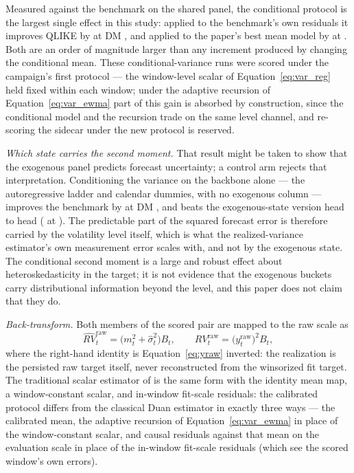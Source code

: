 Measured against the benchmark on the shared panel, the conditional
protocol is the largest single effect in this study: applied to the
benchmark's own residuals it improves QLIKE by
\unifIncrCondVarBenchDQ{} at DM \unifIncrCondVarBenchDM{}, and applied
to the paper's best mean model by \unifIncrCondVarChampDQ{} at
\unifIncrCondVarChampDM{}. Both are an order of magnitude larger than
any increment produced by changing the conditional mean. These
conditional-variance runs were scored under the campaign's first protocol --- the window-level scalar of Equation~\eqref{eq:var_reg}
held fixed within each window; under the adaptive recursion of
Equation~\eqref{eq:var_ewma} part of this gain is absorbed by
construction, since the conditional model and the recursion trade on
the same level channel, and re-scoring the sidecar under the new
protocol is reserved.

\emph{Which state carries the second moment.} That result might be taken to
show that the exogenous panel predicts forecast uncertainty; a
control arm rejects that interpretation. Conditioning the variance on the backbone alone
--- the autoregressive ladder and calendar dummies, with no exogenous
column --- improves the benchmark by \unifIncrCondVarBenchLevelDQ{} at
DM \unifIncrCondVarBenchLevelDM{}, and beats the exogenous-state
version head to head
(\unifIncrCondVarBenchLevelVsCondVarBenchDQ{} at
\unifIncrCondVarBenchLevelVsCondVarBenchDM{}). The predictable part of
the squared forecast error is therefore carried by the volatility level
itself, which is what the realized-variance estimator's own measurement
error scales with, and not by the exogenous state. The conditional
second moment is a large and robust effect about heteroskedasticity in
the target; it is not evidence that the exogenous buckets carry
distributional information beyond the level, and this paper does not
claim that they do.

\emph{Back-transform.} Both members of the scored pair are mapped to the
raw scale as
\begin{equation}
    \widehat{RV}_t^{\mathrm{raw}}
    = \bigl(m_t^2 + \hat{\sigma}^2_t\bigr) B_t,
    \qquad
    RV_t^{\mathrm{raw}} = \bigl(y^{\mathrm{raw}}_t\bigr)^2 B_t,
    \label{eq:smear_map}
\end{equation}
where the right-hand identity is Equation~\eqref{eq:yraw} inverted: the
realization is the persisted raw target itself, never reconstructed from
the winsorized fit target. The traditional scalar estimator of
\citet{Duan1983} is the same form with the identity mean map, a
window-constant scalar, and in-window fit-scale residuals: the calibrated protocol
differs from the classical Duan estimator in exactly three ways --- the calibrated
mean, the adaptive recursion of Equation~\eqref{eq:var_ewma} in place
of the window-constant scalar, and causal residuals against that mean
on the evaluation scale in place of the in-window fit-scale residuals
(which see the scored window's own errors).

